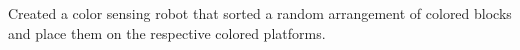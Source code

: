 \documentclass[letterpaper]{deedy-resume-openfont} %
\begin{document}
\begin{minipage}[t]{0.66\textwidth}
\begin{tightemize}
\item Created a color sensing robot that sorted a random arrangement of colored blocks and place them on the respective colored platforms.
\end{tightemize}


\end{minipage} %








\end{document}
